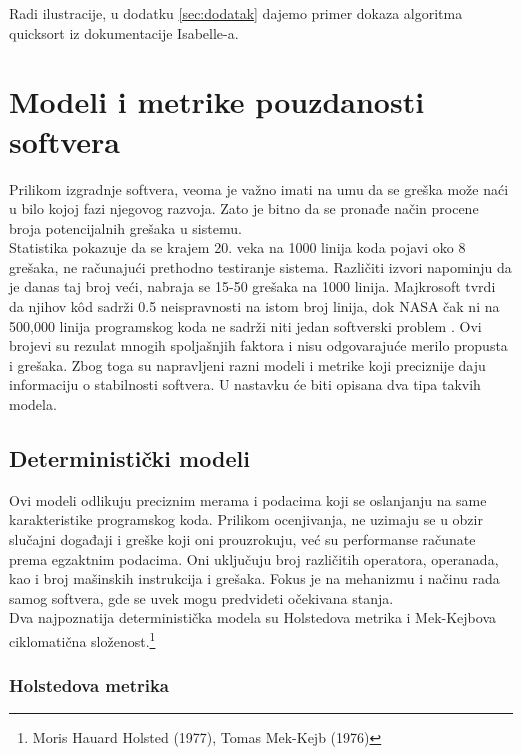 \documentclass[a4paper]{article}
\begin{document}
Radi ilustracije, u dodatku \ref{sec:dodatak} dajemo primer dokaza algoritma quicksort iz dokumentacije Isabelle-a.


\section{Modeli i metrike pouzdanosti softvera}	
\label{sec:modeli_metrike}

Prilikom izgradnje softvera, veoma je važno imati na umu da se greška može naći u bilo kojoj fazi njegovog razvoja. Zato je bitno da se pronađe način procene broja potencijalnih grešaka u sistemu.\\
Statistika pokazuje da se krajem 20. veka na 1000 linija koda pojavi oko 8 grešaka, ne računajući prethodno testiranje sistema. Različiti izvori napominju da je danas taj broj veći, nabraja se 15-50 grešaka na 1000 linija. Majkrosoft tvrdi da njihov k\^{o}d sadrži 0.5 neispravnosti na istom broj linija, dok NASA čak ni na 500,000 linija programskog koda ne sadrži niti jedan softverski problem \cite{Statistika_prosek_gresaka}. Ovi brojevi su rezulat mnogih spoljašnjih faktora i nisu odgovarajuće merilo propusta i grešaka. Zbog toga su napravljeni razni modeli i metrike koji preciznije daju informaciju o stabilnosti softvera. U nastavku će biti opisana dva tipa takvih modela.\\


\subsection{Deterministički modeli}
\label{sec:deterministicki}

Ovi modeli odlikuju preciznim merama i podacima koji se oslanjanju na same karakteristike programskog koda. Prilikom ocenjivanja, ne uzimaju se u obzir slučajni događaji i greške koji oni prouzrokuju, već su performanse računate prema egzaktnim podacima. Oni uključuju broj različitih operatora, operanada, kao i broj mašinskih instrukcija i grešaka. Fokus je na mehanizmu i načinu rada samog softvera, gde se uvek mogu predvideti očekivana stanja.\\
Dva najpoznatija deterministička modela su Holstedova metrika i Mek-Kejbova ciklomatična složenost.\footnote{Moris Hauard Holsted (1977), Tomas Mek-Kejb (1976)}

\subsubsection{Holstedova metrika}
\label{subsec:holsted}
\end{document}
